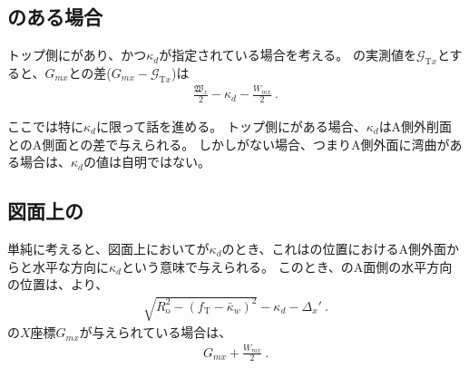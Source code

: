\subsection{\Outcut のある場合}
トップ側に\Outcut があり、かつ\AsideKeywayDepth$\kappa_d$が指定されている場合を考える。
\TopOutcutCenter の実測値を$\mathcal G_{\mathrm Tx}$とすると、\KeywayCenter$G_{mx}$との差($G_{mx}-\mathcal G_{\mathrm Tx}$)は
\begin{align}
  \label{eq:mizocenterAG}
  \frac{\mathfrak W_x}2-\kappa_d-\frac{W_{mx}}2\ .
\end{align}



\clearpage
ここでは特に\AsideKeywayDepth$\kappa_d$に限って話を進める。
トップ側に\Outcut がある場合、$\kappa_d$はA側外削面と\Keyway のA側面との差で与えられる。
しかし\Outcut がない場合、つまりA側外面に湾曲がある場合は、$\kappa_d$の値は自明ではない。


\subsection{図面上の\KeywayDepth}
単純に考えると、図面上において\AsideKeywayDepth が$\kappa_d$のとき、これは\KeywayCenter の位置におけるA側外面から\EndFace と水平な方向に$\kappa_d$という意味で与えられる。
このとき、\Keyway のA面側の水平方向の位置は、より、
\begin{align*}
  \sqrt{R_\mathrm o^2-(f_\mathrm T-\bar\kappa_w)^2}-\kappa_d-\Delta_x'\ .
\end{align*}
\KeywayCenter の$X$座標$G_{mx}$が与えられている場合は、
\begin{align*}
  G_{mx}+\frac{W_{mx}}2\ .
\end{align*}


